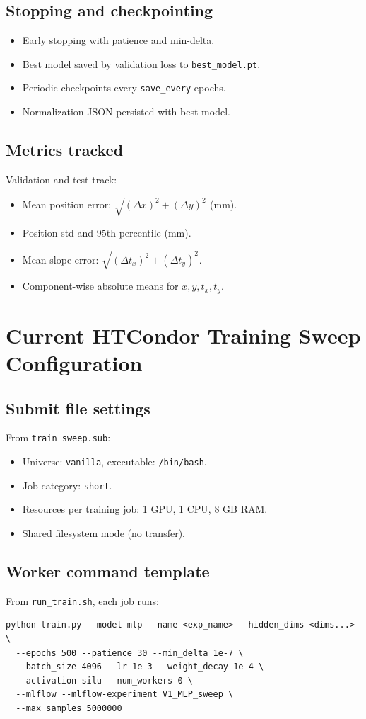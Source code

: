 \documentclass[11pt,a4paper]{article}
\begin{document}
\subsection{Stopping and checkpointing}
\begin{itemize}[leftmargin=*]
  \item Early stopping with patience and min-delta.
  \item Best model saved by validation loss to \texttt{best\_model.pt}.
  \item Periodic checkpoints every \texttt{save\_every} epochs.
  \item Normalization JSON persisted with best model.
\end{itemize}

\subsection{Metrics tracked}
Validation and test track:
\begin{itemize}[leftmargin=*]
  \item Mean position error: $\sqrt{(\Delta x)^2 + (\Delta y)^2}$ (mm).
  \item Position std and 95th percentile (mm).
  \item Mean slope error: $\sqrt{(\Delta t_x)^2 + (\Delta t_y)^2}$.
  \item Component-wise absolute means for $x,y,t_x,t_y$.
\end{itemize}

\section{Current HTCondor Training Sweep Configuration}
\subsection{Submit file settings}
From \texttt{train\_sweep.sub}:
\begin{itemize}[leftmargin=*]
  \item Universe: \texttt{vanilla}, executable: \texttt{/bin/bash}.
  \item Job category: \texttt{short}.
  \item Resources per training job: 1 GPU, 1 CPU, 8 GB RAM.
  \item Shared filesystem mode (no transfer).
\end{itemize}

\subsection{Worker command template}
From \texttt{run\_train.sh}, each job runs:
\begin{lstlisting}[style=bashstyle]
python train.py --model mlp --name <exp_name> --hidden_dims <dims...> \
  --epochs 500 --patience 30 --min_delta 1e-7 \
  --batch_size 4096 --lr 1e-3 --weight_decay 1e-4 \
  --activation silu --num_workers 0 \
  --mlflow --mlflow-experiment V1_MLP_sweep \
  --max_samples 5000000
\end{lstlisting}
\end{document}

